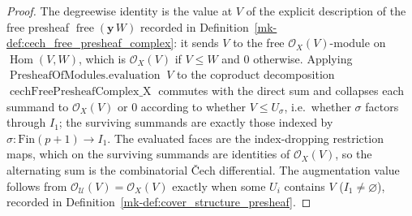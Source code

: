 \begin{proof}
  The degreewise identity is the value at \(V\) of the explicit description of the
  free presheaf \(\operatorname{free}(\mathbf{y}\,W)\) recorded in
  Definition~\ref{mk-def:cech_free_presheaf_complex}: it sends \(V\) to the free
  \(\mathcal{O}_X(V)\)-module on \(\operatorname{Hom}(V, W)\), which is
  \(\mathcal{O}_X(V)\) if \(V \leq W\) and \(0\) otherwise. Applying
  \(\operatorname{PresheafOfModules.evaluation}\;V\) to the coproduct decomposition
  \(\operatorname{cechFreePresheafComplex\_X}\) commutes with the direct sum and
  collapses each summand to \(\mathcal{O}_X(V)\) or \(0\) according to whether
  \(V \leq U_\sigma\), i.e.\ whether \(\sigma\) factors through \(I_1\); the surviving
  summands are exactly those indexed by \(\sigma : \mathrm{Fin}(p+1) \to I_1\). The
  evaluated faces are the index-dropping restriction maps, which on the surviving
  summands are identities of \(\mathcal{O}_X(V)\), so the alternating sum is the
  combinatorial {\v C}ech differential. The augmentation value follows from
  \(\mathcal{O}_{\mathcal{U}}(V) = \mathcal{O}_X(V)\) exactly when some \(U_i\)
  contains \(V\) (\(I_1 \neq \varnothing\)), recorded in
  Definition~\ref{mk-def:cover_structure_presheaf}.
\end{proof}

